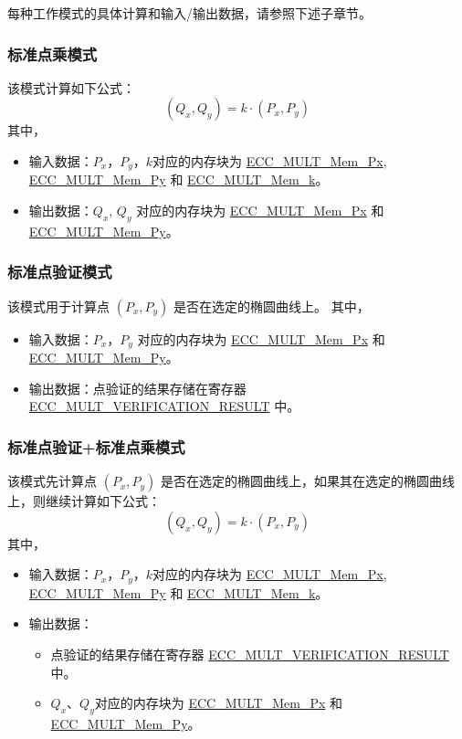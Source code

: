 \documentclass[main\_\_CN.tex]{subfiles}
\begin{document}
每种工作模式的具体计算和输入/输出数据，请参照下述子章节。
\subsubsection{标准点乘模式}

该模式计算如下公式：
\[
(Q_x,Q_y) = k \cdot (P_x,P_y)
\]
其中，
\begin{itemize}
    \item 输入数据：$P_x$，$P_y$，$k$对应的内存块为 \hyperref[tab:ecc-memory]{ECC\_MULT\_Mem\_Px}, \hyperref[tab:ecc-memory]{ECC\_MULT\_Mem\_Py} 和 \hyperref[tab:ecc-memory]{ECC\_MULT\_Mem\_k}。
    \item 输出数据：$Q_x$, $Q_y$ 对应的内存块为 \hyperref[tab:ecc-memory]{ECC\_MULT\_Mem\_Px} 和 \hyperref[tab:ecc-memory]{ECC\_MULT\_Mem\_Py}。
\end{itemize}



\subsubsection{标准点验证模式}

该模式用于计算点 $(P_x, P_y)$ 是否在选定的椭圆曲线上。
其中，
\begin{itemize}
    \item 输入数据：$P_x$，$P_y$ 对应的内存块为 \hyperref[tab:ecc-memory]{ECC\_MULT\_Mem\_Px} 和 \hyperref[tab:ecc-memory]{ECC\_MULT\_Mem\_Py}。
    \item 输出数据：点验证的结果存储在寄存器 \hyperref[fielddesc:ECCMULTVERIFICATIONRESULT]{ECC\_MULT\_VERIFICATION\_RESULT} 中。
\end{itemize}

\subsubsection{标准点验证+标准点乘模式}
该模式先计算点 $(P_x,P_y)$ 是否在选定的椭圆曲线上，如果其在选定的椭圆曲线上，则继续计算如下公式：
\[
(Q_x,Q_y) = k \cdot (P_x,P_y)
\]
其中，
\begin{itemize}
    \item 输入数据：$P_x$，$P_y$，$k$对应的内存块为 \hyperref[tab:ecc-memory]{ECC\_MULT\_Mem\_Px}, \hyperref[tab:ecc-memory]{ECC\_MULT\_Mem\_Py} 和 \hyperref[tab:ecc-memory]{ECC\_MULT\_Mem\_k}。
    \item 输出数据：
    \begin{itemize}
        \item 点验证的结果存储在寄存器 \hyperref[fielddesc:ECCMULTVERIFICATIONRESULT]{ECC\_MULT\_VERIFICATION\_RESULT} 中。
        \item $Q_x$、$Q_y$对应的内存块为 \hyperref[tab:ecc-memory]{ECC\_MULT\_Mem\_Px} 和 \hyperref[tab:ecc-memory]{ECC\_MULT\_Mem\_Py}。
    \end{itemize}
\end{itemize}
\end{document}
